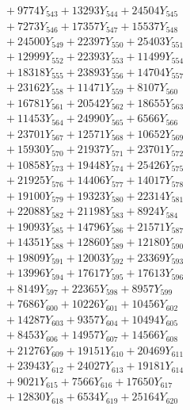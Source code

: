 \documentclass[a4paper,10pt]{article}
\begin{document}
{\begin{align}
&\;  + 9774 Y_{543} + 13293 Y_{544} + 24504 Y_{545} \\[0.3ex]
&\;  + 7273 Y_{546} + 17357 Y_{547} + 15537 Y_{548} \\[0.3ex]
&\;  + 24500 Y_{549} + 22397 Y_{550} + 25403 Y_{551} \\[0.3ex]
&\;  + 12999 Y_{552} + 22393 Y_{553} + 11499 Y_{554} \\[0.3ex]
&\;  + 18318 Y_{555} + 23893 Y_{556} + 14704 Y_{557} \\[0.3ex]
&\;  + 23162 Y_{558} + 11471 Y_{559} + 8107 Y_{560} \\[0.3ex]
&\;  + 16781 Y_{561} + 20542 Y_{562} + 18655 Y_{563} \\[0.3ex]
&\;  + 11453 Y_{564} + 24990 Y_{565} + 6566 Y_{566} \\[0.3ex]
&\;  + 23701 Y_{567} + 12571 Y_{568} + 10652 Y_{569} \\[0.5ex]\allowbreak
&\;  + 15930 Y_{570} + 21937 Y_{571} + 23701 Y_{572} \\[0.3ex]
&\;  + 10858 Y_{573} + 19448 Y_{574} + 25426 Y_{575} \\[0.3ex]
&\;  + 21925 Y_{576} + 14406 Y_{577} + 14017 Y_{578} \\[0.3ex]
&\;  + 19100 Y_{579} + 19323 Y_{580} + 22314 Y_{581} \\[0.3ex]
&\;  + 22088 Y_{582} + 21198 Y_{583} + 8924 Y_{584} \\[0.3ex]
&\;  + 19093 Y_{585} + 14796 Y_{586} + 21571 Y_{587} \\[0.3ex]
&\;  + 14351 Y_{588} + 12860 Y_{589} + 12180 Y_{590} \\[0.3ex]
&\;  + 19809 Y_{591} + 12003 Y_{592} + 23369 Y_{593} \\[0.3ex]
&\;  + 13996 Y_{594} + 17617 Y_{595} + 17613 Y_{596} \\[0.3ex]
&\;  + 8149 Y_{597} + 22365 Y_{598} + 8957 Y_{599} \\[0.5ex]\allowbreak
&\;  + 7686 Y_{600} + 10226 Y_{601} + 10456 Y_{602} \\[0.3ex]
&\;  + 14287 Y_{603} + 9357 Y_{604} + 10494 Y_{605} \\[0.3ex]
&\;  + 8453 Y_{606} + 14957 Y_{607} + 14566 Y_{608} \\[0.3ex]
&\;  + 21276 Y_{609} + 19151 Y_{610} + 20469 Y_{611} \\[0.3ex]
&\;  + 23943 Y_{612} + 24027 Y_{613} + 19181 Y_{614} \\[0.3ex]
&\;  + 9021 Y_{615} + 7566 Y_{616} + 17650 Y_{617} \\[0.3ex]
&\;  + 12830 Y_{618} + 6534 Y_{619} + 25164 Y_{620} \\[0.3ex]

\end{align}}
\end{document}
